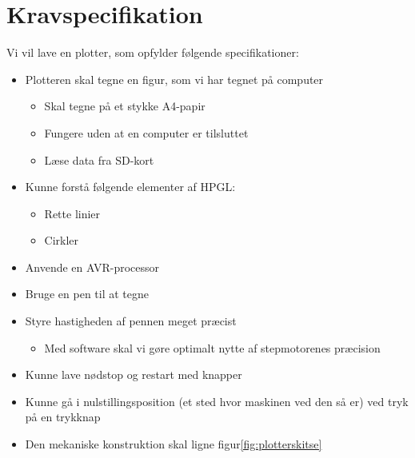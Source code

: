 \section{Kravspecifikation}

Vi vil lave en plotter, som opfylder følgende specifikationer:

\begin{itemize}
\item Plotteren skal tegne en figur, som vi har tegnet på computer
  \begin{itemize}
  \item Skal tegne på et stykke A4-papir
  \item Fungere uden at en computer er tilsluttet
  \item Læse data fra SD-kort
  \end{itemize}
\item Kunne forstå følgende elementer af HPGL:
  \begin{itemize}
  \item Rette linier
  \item Cirkler
  \end{itemize}
\item Anvende en AVR-processor
\item Bruge en pen til at tegne
\item Styre hastigheden af pennen meget præcist
  \begin{itemize}
  \item Med software skal vi gøre optimalt nytte af stepmotorenes præcision
  \end{itemize}
\item Kunne lave nødstop og restart med knapper
\item Kunne gå i nulstillingsposition (et sted hvor maskinen ved den
  så er) ved tryk på en trykknap
\item Den mekaniske konstruktion skal ligne figur\vref{fig:plotterskitse}
\end{itemize}
